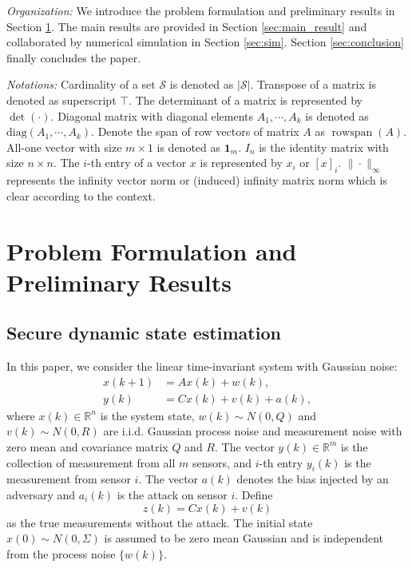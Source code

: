 \documentclass{ieeetrans}   %
\newcommand{\Sc}{{\mathcal{S}}}
\newcommand{\ift}{{\infty}}
\DeclareMathOperator{\rs}{{rowspan}}
\begin{document}
\textit{Organization:} We introduce the problem formulation and preliminary results in Section \ref{sec:problem}. The main results are provided in Section \ref{sec:main_result} and collaborated by numerical simulation in Section \ref{sec:sim}. Section \ref{sec:conclusion} finally concludes the paper.

\textit{Notations:}
Cardinality of a set $\Sc$ is denoted as $|\Sc|$. Transpose of a matrix is denoted as superscript $\top$.
The determinant of a matrix is represented by $\det(\cdot)$. 
Diagonal matrix with diagonal elements $A_1,\cdots,A_k$ is denoted as $\text{diag}(A_1,\cdots,A_k)$.
Denote the span of row vectors of matrix $A$ as $\rs(A)$.
All-one vector with size $m\times 1$ is denoted as $\mathbf{1}_{m}$. $I_n$ is the identity matrix with size $n\times n$. 
The $i$-th entry of a vector $x$ is represented by $x_i$ or $[x]_i$. $\|\cdot\|_\ift$ represents the infinity vector norm or (induced) infinity matrix norm which is clear according to the context.


\section{Problem Formulation and Preliminary Results}\label{sec:problem}	
\subsection{Secure dynamic state estimation}
In this paper, we consider the linear time-invariant system with Gaussian noise:
\begin{align}
x(k+1)&=A x(k)+w(k) , \label{eq:system} \\
y(k)&=C x(k)+v(k)+a(k) ,\label{eq:y_i_def}
\end{align}
where $x(k) \in \mathbb{R}^{n}$ is the system state, $w(k) \sim {N}(0, Q)$ and $v(k) \sim {N}(0, R)$ are i.i.d. Gaussian process noise and measurement noise with zero mean and covariance matrix $Q$ and $R$.  
The vector $y(k)\in \mathbb{R}^{m}$ is the collection of measurement from all $m$ sensors, and $i$-th entry $y_i(k)$ is the measurement from sensor $i$.
The vector $a(k)$ denotes the bias injected by an adversary and $a_i(k)$ is the attack on sensor $i$. Define $$z(k)=C x(k)+v(k)$$ as the true measurements without the attack.
The initial state $x(0) \sim {N}(0, \Sigma)$ is assumed to be zero mean Gaussian and is independent from the process noise $\{w(k)\}$.
\end{document}
